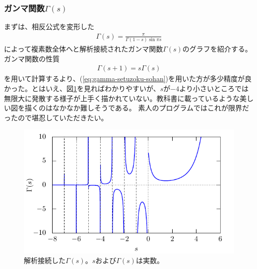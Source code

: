\documentclass[11pt,b5paper,papersize,dvipdfmx]{jsbook}
\begin{document}
%
\subsubsection{ガンマ関数$\Gamma(s)$}
%
まずは、相反公式を変形した
\begin{align}
  \Gamma(s) = \frac{\pi}{\Gamma(1-s) \sin \pi s}
  \label{eq:gamma-setuzoku-sohan}
\end{align}
によって複素数全体へと解析接続されたガンマ関数$\Gamma(s)$のグラフを紹介する。ガンマ関数の性質
\begin{align}
  \Gamma(s+1) = s\Gamma(s)
  \label{eq:Gamma-1}
\end{align}
を用いて計算するより、(\ref{eq:gamma-setuzoku-sohan})を用いた方が多少精度が良かった。とはいえ、図\ref{fig:gamma-real}を見ればわかりやすいが、$s$が$-4$より小さいところでは無限大に発散する様子が上手く描かれていない。教科書に載っているような美しい図を描くのはなかなか難しそうである。
素人のプログラムではこれが限界だったので堪忍していただきたい。

%
\begin{figure}[H]
  \centering
  \includegraphics{nkym/gnuplot/gamma/real-main.pdf}
  \caption{解析接続した$\Gamma(s)$。$s$および$\Gamma(s)$は実数。}
  \label{fig:gamma-real}
\end{figure}
\end{document}
